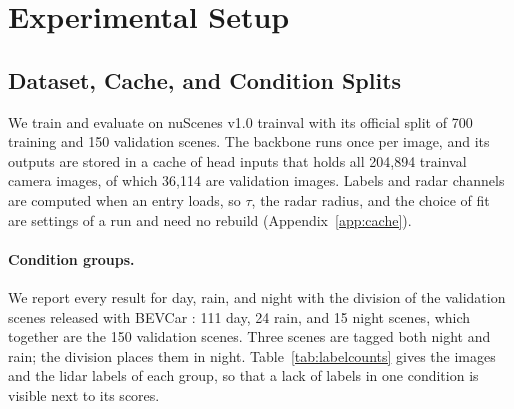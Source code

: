 %
%
\section{Experimental Setup}
\label{sec:setup}

\subsection{Dataset, Cache, and Condition Splits}
\label{sec:data}

We train and evaluate on nuScenes v1.0 trainval \citep{caesar2020nuscenes} with its official split of 700 training and 150 validation scenes. The backbone runs once per image, and its outputs are stored in a cache of head inputs that holds all 204,894 trainval camera images, of which 36,114 are validation images. Labels and radar channels are computed when an entry loads, so $\tau$, the radar radius, and the choice of fit are settings of a run and need no rebuild (Appendix~\ref{app:cache}).

\paragraph{Condition groups.} We report every result for day, rain, and night with the division of the validation scenes released with BEVCar \citep{schramm2024bevcar}: 111 day, 24 rain, and 15 night scenes, which together are the 150 validation scenes. Three scenes are tagged both night and rain; the division places them in night. Table~\ref{tab:labelcounts} gives the images and the lidar labels of each group, so that a lack of labels in one condition is visible next to its scores.

